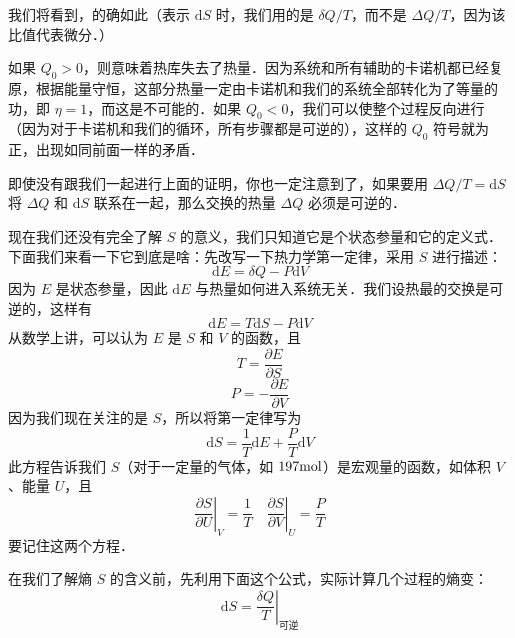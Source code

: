 我们将看到，的确如此（表示 $\mathrm dS $ 时，我们用的是 $\delta Q/T$，而不是 $\Delta Q/T$，因为该比值代表微分．）

如果 $Q_0>0$，则意味着热库失去了热量．因为系统和所有辅助的卡诺机都已经复原，根据能量守恒，这部分热量一定由卡诺机和我们的系统全部转化为了等量的功，即 $\eta=1$，而这是不可能的．如果 $Q_0<0$，我们可以使整个过程反向进行（因为对于卡诺机和我们的循环，所有步骤都是可逆的），这样的 $Q_0$ 符号就为正，出现如同前面一样的矛盾．

即使没有跟我们一起进行上面的证明，你也一定注意到了，如果要用 $\Delta Q/T=\mathrm d S$ 将 $\Delta Q$ 和 $\mathrm dS$ 联系在一起，那么交换的热量 $\Delta Q$ 必须是可逆的．

现在我们还没有完全了解 $S$ 的意义，我们只知道它是个状态参量和它的定义式．下面我们来看一下它到底是啥：先改写一下热力学第一定律，采用 $S$ 进行描述：
\begin{equation}
\mathrm d E = \delta{Q} - P\mathrm d V
\end{equation}
因为 $E$ 是状态参量，因此 $\mathrm d E$ 与热量如何进入系统无关．我们设热最的交换是可逆的，这样有
\begin{equation}
\mathrm d E =T\mathrm dS - P\mathrm d V
\end{equation}
从数学上讲，可以认为 $E$ 是 $S $ 和 $V $ 的函数，且
\begin{equation}
T=\frac{\partial E}{\partial S}
\end{equation}
\begin{equation}
P=-\frac{\partial E}{\partial V}
\end{equation}
因为我们现在关注的是 $S$，所以将第一定律写为
\begin{equation}
\text{d}S=\frac{1}{T}\text{d}E+\frac{P}{T}\text{d}V
\end{equation}
此方程告诉我们 $S$（对于一定量的气体，如 $197 \rm mol$）是宏观量的函数，如体积 $V $、能量 $U$，且
\begin{equation}
\left. \frac{\partial S}{\partial U} \right|_V=\frac{1}{T}\quad \left. \frac{\partial S}{\partial V} \right|_U=\frac{P}{T}
\end{equation}
要记住这两个方程．

在我们了解熵 $S $ 的含义前，先利用下面这个公式，实际计算几个过程的熵变：
\begin{equation}
\left. \text{d}S=\frac{\delta Q}{T} \right|_{\text{可逆}}
\end{equation}


